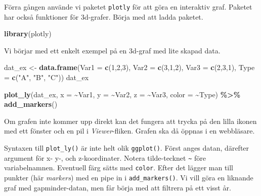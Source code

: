 \documentclass[
]{book}
\newenvironment{Shaded}{\begin{snugshade}}{\end{snugshade}}
\newcommand{\AttributeTok}[1]{\textcolor[rgb]{0.13,0.29,0.53}{#1}}
\newcommand{\DecValTok}[1]{\textcolor[rgb]{0.00,0.00,0.81}{#1}}
\newcommand{\FunctionTok}[1]{\textcolor[rgb]{0.13,0.29,0.53}{\textbf{#1}}}
\newcommand{\NormalTok}[1]{#1}
\newcommand{\OtherTok}[1]{\textcolor[rgb]{0.56,0.35,0.01}{#1}}
\newcommand{\SpecialCharTok}[1]{\textcolor[rgb]{0.81,0.36,0.00}{\textbf{#1}}}
\newcommand{\StringTok}[1]{\textcolor[rgb]{0.31,0.60,0.02}{#1}}
\theoremstyle{definition}
\theoremstyle{definition}
\theoremstyle{definition}
\theoremstyle{definition}
\theoremstyle{remark}
\begin{document}
Förra gången använde vi paketet \texttt{plotly} för att göra en interaktiv graf. Paketet har också funktioner för 3d-grafer. Börja med att ladda paketet.

\begin{Shaded}
\begin{Highlighting}[]
\FunctionTok{library}\NormalTok{(plotly)}
\end{Highlighting}
\end{Shaded}

Vi börjar med ett enkelt exempel på en 3d-graf med lite skapad data.

\begin{Shaded}
\begin{Highlighting}[]
\NormalTok{dat\_ex }\OtherTok{\textless{}{-}} \FunctionTok{data.frame}\NormalTok{(}\AttributeTok{Var1 =} \FunctionTok{c}\NormalTok{(}\DecValTok{1}\NormalTok{,}\DecValTok{2}\NormalTok{,}\DecValTok{3}\NormalTok{), }\AttributeTok{Var2 =} \FunctionTok{c}\NormalTok{(}\DecValTok{3}\NormalTok{,}\DecValTok{1}\NormalTok{,}\DecValTok{2}\NormalTok{), }\AttributeTok{Var3 =} \FunctionTok{c}\NormalTok{(}\DecValTok{2}\NormalTok{,}\DecValTok{3}\NormalTok{,}\DecValTok{1}\NormalTok{), }\AttributeTok{Type =} \FunctionTok{c}\NormalTok{(}\StringTok{"A"}\NormalTok{, }\StringTok{"B"}\NormalTok{, }\StringTok{"C"}\NormalTok{))}
\NormalTok{dat\_ex}

\FunctionTok{plot\_ly}\NormalTok{(dat\_ex, }\AttributeTok{x =} \SpecialCharTok{\textasciitilde{}}\NormalTok{Var1, }\AttributeTok{y =} \SpecialCharTok{\textasciitilde{}}\NormalTok{Var2, }\AttributeTok{z =} \SpecialCharTok{\textasciitilde{}}\NormalTok{Var3, }\AttributeTok{color =} \SpecialCharTok{\textasciitilde{}}\NormalTok{Type) }\SpecialCharTok{\%\textgreater{}\%} 
  \FunctionTok{add\_markers}\NormalTok{()}
\end{Highlighting}
\end{Shaded}

Om grafen inte kommer upp direkt kan det fungera att trycka på den lilla ikonen med ett fönster och en pil i \emph{Viewer}-fliken. Grafen ska då öppnas i en webbläsare.

Syntaxen till \texttt{plot\_ly()} är inte helt olik \texttt{ggplot()}. Först anges datan, därefter argument för x- y-, och z-koordinater. Notera tilde-tecknet \texttt{\textasciitilde{}} före variabelnamnen. Eventuell färg sätts med \texttt{color}. Efter det lägger man till punkter (här \emph{markers}) med en pipe in i \texttt{add\_markers()}. Vi vill göra en liknande graf med gapminder-datan, men får börja med att filtrera på ett visst år.
\end{document}
